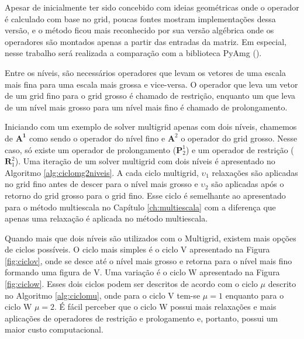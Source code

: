 Apesar de inicialmente ter sido concebido com ideias geométricas onde o operador é calculado com base no grid, poucas fontes mostram implementações dessa versão, e o método ficou mais reconhecido por sua versão algébrica onde os operadores são montados apenas a partir das entradas da matriz. Em especial, nesse trabalho será realizada a comparação com a biblioteca PyAmg (\citet{OlSc2018}).


Entre os níveis, são necessários operadores que levam os vetores de uma escala mais fina para uma escala mais grossa e vice-versa. O operador que leva um vetor de um grid fino para o grid grosso é chamado de restrição, enquanto um que leva de um nível mais grosso para um nível mais fino é chamado de prolongamento. 


Iniciando com um exemplo de solver multigrid apenas com dois níveis, chamemos de $\mathbf{A^1}$ como sendo o operador do nível fino e $\mathbf{A}^2$ o operador do grid grosso. Nesse caso, só existe um operador de prolongamento ($\mathbf{P}_2^1$) e um operador de restrição ($\mathbf{R}^2_1$). Uma iteração de um solver multigrid com dois níveis é apresentado no Algoritmo \ref{alg:ciclomg2niveis}. A cada ciclo multigrid, $\upsilon_1$ relaxações são aplicadas no grid fino antes de descer para o nível mais grosso e $\upsilon_2$ são aplicadas após o retorno do grid grosso para o grid fino. Esse ciclo é semelhante ao apresentado para o método multiescala no Capítulo \ref{ch:multiescala} com a diferença que apenas uma relaxação é aplicada no método multiescala.


Quando mais que dois níveis são utilizados com o Multigrid, existem mais opções de ciclos possíveis. O ciclo mais simples é o ciclo V apresentado na Figura \ref{fig:ciclov}, onde se desce até o nível mais grosso e retorna para o nível mais fino formando uma figura de V. Uma variação é o ciclo W apresentado na Figura \ref{fig:ciclow}. Esses dois ciclos podem ser descritos de acordo com o ciclo $\mu$ descrito no Algoritmo \ref{alg:ciclomu}, onde para o ciclo V tem-se $\mu = 1$ enquanto para o ciclo W $\mu = 2$. É fácil perceber que o ciclo W possui mais relaxações e mais aplicações de operadores de restrição e prologamento e, portanto, possui um maior custo computacional.

